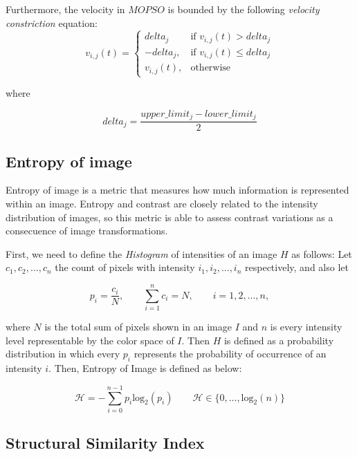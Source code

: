 \documentclass[11pt]{article}
\begin{document}
Furthermore, the velocity in $MOPSO$ is bounded by the following \textit{velocity constriction} equation:
\begin{equation}\label{eq:restricciondelta}
v_{i,j}(t)= 
\begin{cases}
    delta_j & \text{if } v_{i,j}(t) > delta_j\\
    -delta_j,      & \text{if } v_{i,j}(t) \leq delta_j \\
    v_{i,j}(t),      & \text{otherwise }
\end{cases}
\end{equation}

where

\begin{equation}
delta_j=\frac{upper\_limit_j - lower\_limit_j}{2}
\end{equation}


\subsection{Entropy of image}

Entropy of image \cite{108593} is a metric that measures how much information is represented within an image. Entropy and contrast are closely related to the intensity distribution of images, so this metric is able to assess contrast variations as a consecuence of image transformations.

First, we need to define the \textit{Histogram} of intensities of an image $H$ as follows: Let $c_1, c_2, ..., c_n$ the count of pixels with intensity $i_1, i_2, ..., i_n$ respectively, and also let

\begin{equation}
p_i=\frac{c_i}{N}, \qquad \sum_{i=1}^n c_i = N, \qquad i= 1,2, ..., n,
\end{equation}

where $N$ is the total sum of pixels shown in an image $I$ and $n$ is every intensity level representable by the color space of $I$. Then $H$ is defined as a probability distribution in which every $p_i$ represents the probability of occurrence of an intensity $i$. Then, Entropy of Image is defined as below:

\begin{equation}
\mathscr{H}= -\sum_{i=0}^{n-1} p_i \text{log}_2(p_i) \qquad \mathscr{H} \in \{0,...,\text{log}_2(n)\}
\end{equation}

\subsection{Structural Similarity Index}
\end{document}
